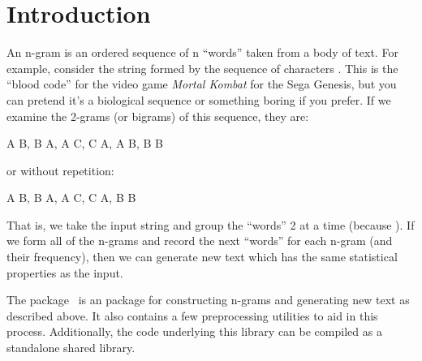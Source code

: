\section{Introduction}
\label{sec:intro}

An n-gram is an ordered sequence of n ``words'' taken from a body of
text.  For example, consider the string formed by the sequence of characters
. This is the ``blood code'' for the video game 
\emph{Mortal Kombat} for the Sega Genesis, but you 
can pretend it's a biological sequence or something boring if you prefer.  If we
examine the 2-grams (or bigrams) of this sequence, they are:
\\
\begin{Code}
A B, B A, A C, C A, A B, B B
\end{Code}
or without repetition:
\\
\begin{Code}
A B, B A, A C, C A, B B
\end{Code}

That is, we take the input string and group the ``words'' 2 at a time (because 
).  If we form all of the n-grams and record the next ``words'' for 
each n-gram (and their frequency), then we can generate new text which has the 
same statistical properties as the input.

The \thispackage package~\citep{ngrampkg} is an \R package for constructing 
n-grams
and generating new text as described above.  It also contains a few 
preprocessing utilities to aid in this process.  Additionally, the \C code 
underlying this library can be compiled as a standalone shared library.